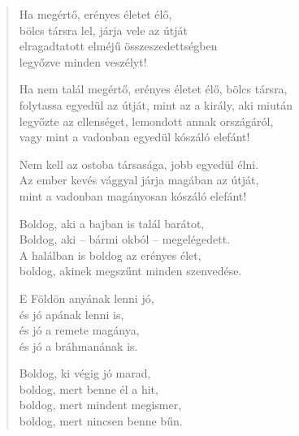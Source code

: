 \begin{verse}
 Ha megértő, erényes életet élő,\\
bölcs társra lel, járja vele az útját\\
elragadtatott elméjű összeszedettségben\\
legyőzve minden veszélyt!

 Ha nem talál megértő, erényes életet élő, bölcs társra,\\
folytassa egyedül az útját, mint az a király, aki miután\\
legyőzte az ellenséget, lemondott annak országáról,\\
vagy mint a vadonban egyedül kószáló elefánt!

 Nem kell az ostoba társasága, jobb egyedül élni.\\
Az ember kevés vággyal járja magában az útját,\\
mint a vadonban magányosan kószáló elefánt!

 Boldog, aki a bajban is talál barátot,\\
Boldog, aki – bármi okból – megelégedett.\\
A halálban is boldog az erényes élet,\\
boldog, akinek megszűnt minden szenvedése.

 E Földön anyának lenni jó,\\
és jó apának lenni is,\\
és jó a remete magánya,\\
és jó a bráhmanának is.

 Boldog, ki végig jó marad,\\
boldog, mert benne él a hit,\\
boldog, mert mindent megismer,\\
boldog, mert nincsen benne bűn.

\end{verse}
